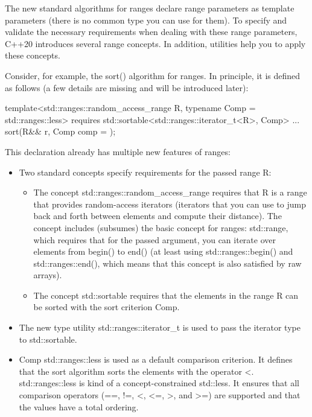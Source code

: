 The new standard algorithms for ranges declare range parameters as template parameters (there is no common type you can use for them). To specify and validate the necessary requirements when dealing with these range parameters, C++20 introduces several range concepts. In addition, utilities help you to apply these concepts.

Consider, for example, the sort() algorithm for ranges. In principle, it is defined as follows (a few details are missing and will be introduced later):

\begin{cpp}
template<std::ranges::random_access_range R,
		typename Comp = std::ranges::less>
requires std::sortable<std::ranges::iterator_t<R>, Comp>
... sort(R&& r, Comp comp = {});
\end{cpp}

This declaration already has multiple new features of ranges:

\begin{itemize}
\item
Two standard concepts specify requirements for the passed range R:

\begin{itemize}
\item
The concept std::ranges::random\_access\_range requires that R is a range that provides random-access iterators (iterators that you can use to jump back and forth between elements and compute their distance). The concept includes (subsumes) the basic concept for ranges: std::range, which requires that for the passed argument, you can iterate over elements from begin() to end() (at least using std::ranges::begin() and std::ranges::end(), which means that this concept is also satisfied by raw arrays).

\item
The concept std::sortable requires that the elements in the range R can be sorted with the sort criterion Comp.
\end{itemize}

\item
The new type utility std::ranges::iterator\_t is used to pass the iterator type to std::sortable.

\item
Comp std::ranges::less is used as a default comparison criterion. It defines that the sort algorithm sorts the elements with the operator <. std::ranges::less is kind of a concept-constrained std::less. It ensures that all comparison operators (==, !=, <, <=, >, and >=) are supported and that the values have a total ordering.
\end{itemize}

